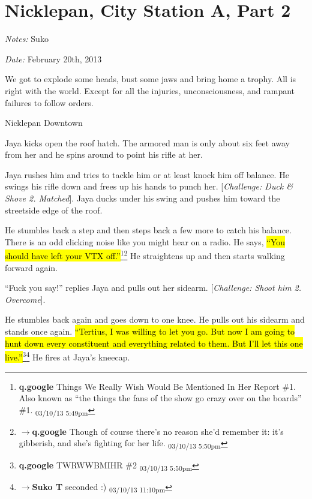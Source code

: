 \setcounter{chapter}{ 15 }
\chapter{\textbf{Nicklepan, City Station A, Part 2} }






\textit{Notes:} Suko

\textit{Date:} February 20th, 2013



We got to explode some heads, bust some jaws and bring home a trophy.  All is right with the world.  Except for all the injuries, unconsciousness, and rampant failures to follow orders.



\noindent\hrulefill





 {\LARGE Nicklepan Downtown } 



Jaya kicks open the roof hatch.  The armored man is only about six feet away from her and he spins around to point his rifle at her.



Jaya rushes him and tries to tackle him or at least knock him off balance.  He swings his rifle down and frees up his hands to punch her.  {[}\textit{Challenge: Duck \& Shove 2.  Matched}{]}. Jaya ducks under his swing and pushes him toward the streetside edge of the roof.



He stumbles back a step and then steps back a few more to catch his balance.  There is  an odd clicking noise like you might hear on a radio.  He says, \hl{``You should have left your VTX off.''}\footnote{\textbf{q.google }Things We Really Wish Would Be Mentioned In Her Report \#1.
Also known as ``the things the fans of the show go crazy over on the boards'' \#1. \textsubscript{03/10/13 5:49pm}}\footnote{$\rightarrow$\textbf{q.google }Though of course there's no reason she'd remember it: it's gibberish, and she's fighting for her life. \textsubscript{03/10/13 5:50pm}}  He straightens up and then starts walking forward again.



``Fuck you say!'' replies Jaya and pulls out her sidearm.  {[}\textit{Challenge: Shoot him 2.  Overcome}{]}.  



He stumbles back again and goes down to one knee.  He pulls out his sidearm and stands once again.  \hl{``Tertius, I was willing to let you go.  But now I am going to hunt down every constituent and everything related to them.  But I'll let this one live.''}\footnote{\textbf{q.google }TWRWWBMIHR \#2 \textsubscript{03/10/13 5:50pm}}\footnote{$\rightarrow$\textbf{Suko T }seconded :) \textsubscript{03/10/13 11:10pm}}  He fires at Jaya's kneecap.


